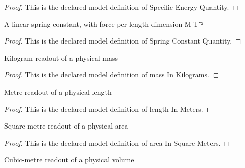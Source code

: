 \begin{proof}
  This is the declared model definition of Specific Energy Quantity.
\end{proof}
\begin{definition}
  \label{def:physics:phyx-mini-0452:phyxminiproblems-problemphyxmini0452-springconstantquantity}
  A linear spring constant, with force-per-length dimension M T⁻²
\end{definition}
\begin{proof}
  This is the declared model definition of Spring Constant Quantity.
\end{proof}
\begin{definition}
  \label{def:physics:phyx-mini-0452:phyxminiproblems-problemphyxmini0452-massinkilograms}
  Kilogram readout of a physical mass
\end{definition}
\begin{proof}
  This is the declared model definition of mass In Kilograms.
\end{proof}
\begin{definition}
  \label{def:physics:phyx-mini-0452:phyxminiproblems-problemphyxmini0452-lengthinmeters}
  Metre readout of a physical length
\end{definition}
\begin{proof}
  This is the declared model definition of length In Meters.
\end{proof}
\begin{definition}
  \label{def:physics:phyx-mini-0452:phyxminiproblems-problemphyxmini0452-areainsquaremeters}
  Square-metre readout of a physical area
\end{definition}
\begin{proof}
  This is the declared model definition of area In Square Meters.
\end{proof}
\begin{definition}
  \label{def:physics:phyx-mini-0452:phyxminiproblems-problemphyxmini0452-volumeincubicmeters}
  Cubic-metre readout of a physical volume
\end{definition}
